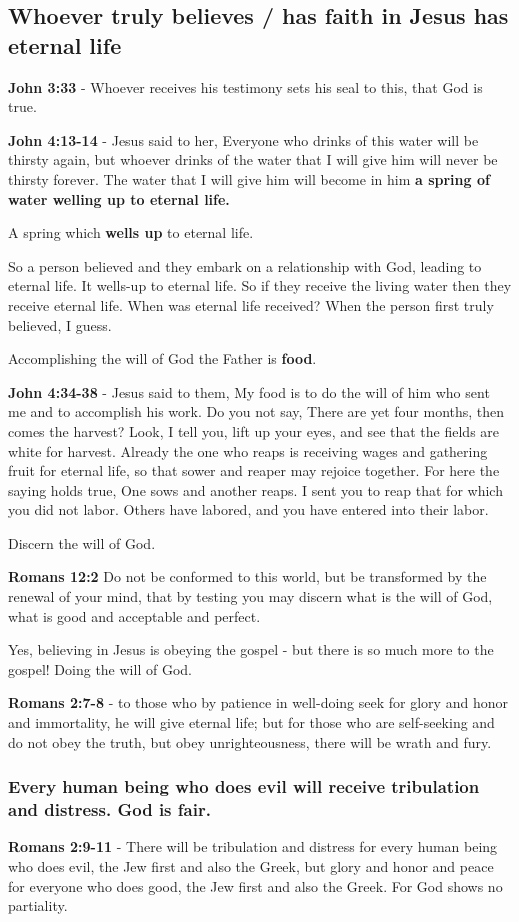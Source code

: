 \documentclass[11pt]{article}
\begin{document}
\subsection{Whoever truly believes / has faith in Jesus has eternal life}
\label{sec:org2e623bf}
\textbf{John 3:33} - Whoever receives his testimony sets his seal to this, that God is true.

\textbf{John 4:13-14} - Jesus said to her, Everyone who drinks of this water will be thirsty again, but whoever drinks of the water that I will give him will never be thirsty forever. The water that I will give him will become in him \textbf{a spring of water welling up to eternal life.}

A spring which \textbf{wells up} to eternal life.

So a person believed and they embark on a relationship with God, leading to eternal life.
It wells-up to eternal life. So if they receive the living water then they receive eternal life.
When was eternal life received? When the person first truly believed, I guess.

Accomplishing the will of God the Father is \textbf{food}.

\textbf{John 4:34-38} - Jesus said to them, My food is to do the will of him who sent me and to accomplish his work. Do you not say, There are yet four months, then comes the harvest? Look, I tell you, lift up your eyes, and see that the fields are white for harvest. Already the one who reaps is receiving wages and gathering fruit for eternal life, so that sower and reaper may rejoice together. For here the saying holds true, One sows and another reaps. I sent you to reap that for which you did not labor. Others have labored, and you have entered into their labor.

Discern the will of God.

\textbf{Romans 12:2} Do not be conformed to this world, but be transformed by the renewal of your mind, that by testing you may discern what is the will of God, what is good and acceptable and perfect.

Yes, believing in Jesus is obeying the gospel - but there is so much more to the gospel! Doing the will of God.

\textbf{Romans 2:7-8} - to those who by patience in well-doing seek for glory and honor and immortality, he will give eternal life; but for those who are self-seeking and do not obey the truth, but obey unrighteousness, there will be wrath and fury.

\subsubsection{Every human being who does evil will receive tribulation and distress. God is fair.}
\label{sec:org433792d}
\textbf{Romans 2:9-11} - There will be tribulation and distress for every human being who does evil, the Jew first and also the Greek, but glory and honor and peace for everyone who does good, the Jew first and also the Greek. For God shows no partiality.
\end{document}
